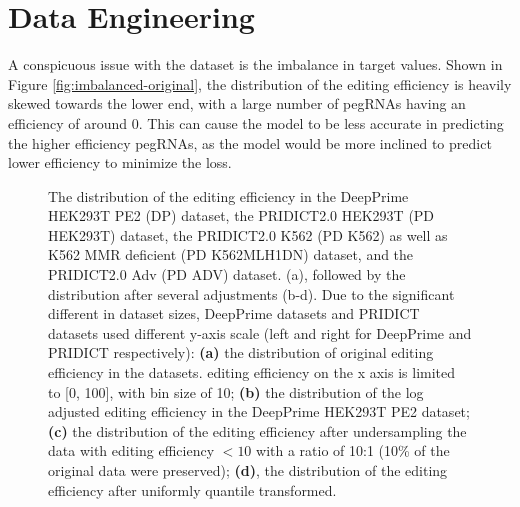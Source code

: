 \section{Data Engineering}
\label{sec:data-engineering}

A conspicuous issue with the dataset is the imbalance in target values. Shown in Figure \ref{fig:imbalanced-original}, the distribution of the editing efficiency is heavily skewed towards the lower end, with a large number of pegRNAs having an efficiency of around 0. This can cause the model to be less accurate in predicting the higher efficiency pegRNAs, as the model would be more inclined to predict lower efficiency to minimize the loss. 

\begin{figure}
    \centering
    \caption[Target Distribution Imbalance]{The distribution of the editing efficiency in the DeepPrime HEK293T PE2 (DP) dataset, the PRIDICT2.0 HEK293T (PD HEK293T) dataset, the PRIDICT2.0 K562 (PD K562) as well as K562 MMR deficient (PD K562MLH1DN) dataset, and the PRIDICT2.0 Adv (PD ADV) dataset. (a), followed by the distribution after several adjustments (b-d). Due to the significant different in dataset sizes, DeepPrime datasets and PRIDICT datasets used different y-axis scale (left and right for DeepPrime and PRIDICT respectively): 
    \textbf{(a)} the distribution of original editing efficiency in the datasets. editing efficiency on the x axis is limited to [0, 100], with bin size of 10; \textbf{(b)} the distribution of the log adjusted editing efficiency in the DeepPrime HEK293T PE2 dataset; \textbf{(c)} the distribution of the editing efficiency after undersampling the data with editing efficiency $<10$ with a ratio of 10:1 (10\% of the original data were preserved); \textbf{(d)}, the distribution of the editing efficiency after uniformly quantile transformed.}
    \label{fig:imbalanced}
\end{figure}

